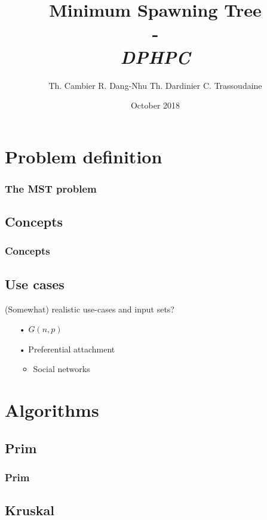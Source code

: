 \documentclass{beamer}
\institute[ETH Zürich]{\textbf{ETH Zürich}}
\date{October 2018}
\author{
    Th. Cambier
    R. Dang-Nhu
    Th. Dardinier
    C. Trassoudaine
}
\title{
	\textbf{Minimum Spawning Tree}\\
	-\\ 
	\textit{DPHPC}
}
\begin{document}
\frame{\titlepage}
\frame{\tableofcontents}


\section{Problem definition}
\begin{frame}
\frametitle{The MST problem}
\end{frame}

\subsection{Concepts}
\begin{frame}
\frametitle{Concepts}
\end{frame}

\subsection{Use cases}

\begin{frame}
(Somewhat) realistic use-cases and input sets?

\begin{itemize}
\item[•] $G(n, p)$
\item[•] Preferential attachment
	\begin{itemize}
	\item Social networks
	\end{itemize}
\end{itemize}
\end{frame}


\section{Algorithms}
\subsection{Prim}
\begin{frame}
\frametitle{Prim}
\end{frame}
\subsection{Kruskal}
\end{document}
